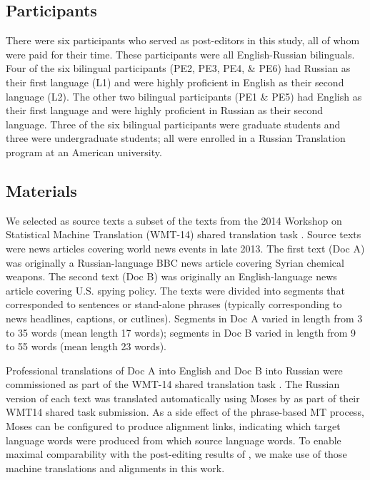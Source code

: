 \subsection{Participants}

There were six participants who served as post-editors in this study, all of whom were paid for their time.
%
These participants were all English-Russian bilinguals.
%
Four of the six bilingual participants (PE2, PE3, PE4, \& PE6) had Russian as their first language (L1) and were highly proficient in English as their second language (L2).
%
The other two bilingual participants (PE1 \& PE5) had English as their first language and were highly proficient in Russian as their second language.
%
Three of the six bilingual participants were graduate students and three were undergraduate students; all were enrolled in a Russian Translation program at an American university. %

%


\subsection{Materials}

We selected as source texts a subset of the texts from the 2014 Workshop on Statistical Machine Translation (WMT-14) shared translation task \citep{2014_WMT_Bojar_etal}.
%
Source texts were news articles covering world news events in late 2013.
%
The first text (Doc A) was originally a Russian-language BBC news article covering Syrian chemical weapons.
%
The second text (Doc B) was originally an English-language news article covering U.S. spying policy.
%
The texts were divided into segments that corresponded to sentences or stand-alone phrases (typically corresponding to news headlines, captions, or cutlines).
%
Segments in Doc A varied in length from 3 to 35 words (mean length 17 words); 
%
segments in Doc B varied in length from 9 to 55 words (mean length 23 words).


Professional translations of Doc A into English and Doc B into Russian were commissioned as part of the WMT-14 shared translation task \citep{2014_WMT_Bojar_etal}.
%
%
The Russian version of each text was translated automatically using Moses \citep{2007_ACL_Koehn} by \citet{2014_WMT_Schwartz_etal} as part of their WMT14 shared task submission.
%
As a side effect of the phrase-based MT process, Moses can be configured to produce alignment links, indicating which target language words were produced from which source language words.
%
To enable maximal comparability with the post-editing results of \citet{2014_WMT_Schwartz_etal}, we make use of those machine translations and alignments in this work.


